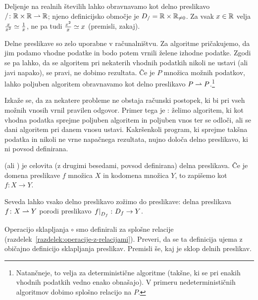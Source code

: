                 \begin{zgled}
                        Deljenje na realnih številih lahko obravnavamo kot delno preslikavo $/\colon \mathbb{R} \times \mathbb{R} \mathrel{\rightharpoonup} \mathbb{R}$; njeno definicijsko območje je $D_{/} = \mathbb{R} \times \mathbb{R}_{\neq 0}$. Za vsak $x \in \mathbb{R}$ velja $\frac{x}{x^2} \simeq \frac{1}{x}$, ne pa tudi $\frac{x^2}{x} \simeq x$ (premisli, zakaj).
                \end{zgled}

                \begin{zgled}
                        Delne preslikave so zelo uporabne v računalništvu. Za algoritme pričakujemo, da jim podamo vhodne podatke in bodo potem vrnili želene izhodne podatke. Zgodi se pa lahko, da se algoritem pri nekaterih vhodnih podatkih nikoli ne ustavi (ali javi napako), se pravi, ne dobimo rezultata. Če je $P$ množica možnih podatkov, lahko poljuben algoritem obravnavamo kot delno preslikavo $P \mathrel{\rightharpoonup} P$.\footnote{Natančneje, to velja za deterministične algoritme (takšne, ki se pri enakih vhodnih podatkih vedno enako obnašajo). V primeru nedeterminističnih algoritmov dobimo splošno relacijo na $P$.}

                        Izkaže se, da za nekatere probleme ne obstaja računski postopek, ki bi pri vseh možnih vnosih vrnil pravilen odgovor. Primer tega je : želimo algoritem, ki kot vhodna podatka sprejme poljuben algoritem in poljuben vnos ter se odloči, ali se dani algoritem pri danem vnosu ustavi. Kakršenkoli program, ki sprejme takšna podatka in nikoli ne vrne napačnega rezultata, nujno določa delno preslikavo, ki ni povsod definirana. 
                \end{zgled}

                \begin{definicija}
                         (ali ) je celovita (z drugimi besedami, povsod definirana) delna preslikava. Če je domena preslikave $f$ množica $X$ in kodomena množica $Y$, to zapišemo kot $f\colon X \to Y$.
                \end{definicija}

                Seveda lahko vsako delno preslikavo zožimo do preslikave: delna preslikava $f\colon X \mathrel{\rightharpoonup} Y$ porodi preslikavo $\left.{f}\right|_{D_{f}}\colon D_{f} \to Y$.

                \begin{naloga}
                        Operacijo sklapljanja $\circ$ smo definirali za splošne relacije (razdelek~\ref{razdelek:operacije-z-relacijami}). Preveri, da se ta definicija ujema z običajno definicijo sklapljanja preslikav. Premisli še, kaj je sklop delnih preslikav.
                \end{naloga}


